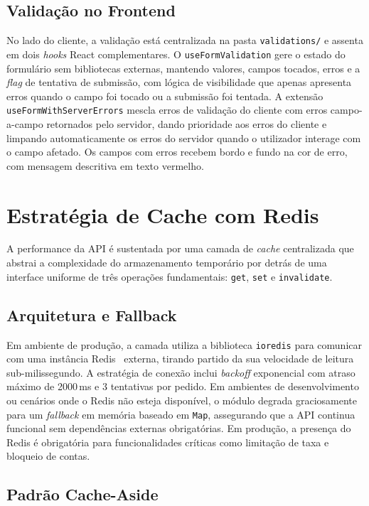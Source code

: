 \documentclass[12pt,a4paper]{report}
\begin{document}
\subsection{Validação no Frontend}

No lado do cliente, a validação está centralizada na pasta \texttt{validations/} e assenta em dois \textit{hooks} React complementares. O \texttt{useFormValidation} gere o estado do formulário sem bibliotecas externas, mantendo valores, campos tocados, erros e a \textit{flag} de tentativa de submissão, com lógica de visibilidade que apenas apresenta erros quando o campo foi tocado ou a submissão foi tentada. A extensão \texttt{useFormWithServerErrors} mescla erros de validação do cliente com erros campo-a-campo retornados pelo servidor, dando prioridade aos erros do cliente e limpando automaticamente os erros do servidor quando o utilizador interage com o campo afetado. Os campos com erros recebem bordo e fundo na cor de erro, com mensagem descritiva em texto vermelho.

\section{Estratégia de Cache com Redis}

A performance da API é sustentada por uma camada de \textit{cache} centralizada que abstrai a complexidade do armazenamento temporário por detrás de uma interface uniforme de três operações fundamentais: \texttt{get}, \texttt{set} e \texttt{invalidate}.

\subsection{Arquitetura e Fallback}

Em ambiente de produção, a camada utiliza a biblioteca \texttt{ioredis} para comunicar com uma instância Redis~\cite{redis} externa, tirando partido da sua velocidade de leitura sub-milissegundo. A estratégia de conexão inclui \textit{backoff} exponencial com atraso máximo de 2000\,ms e 3 tentativas por pedido. Em ambientes de desenvolvimento ou cenários onde o Redis não esteja disponível, o módulo degrada graciosamente para um \textit{fallback} em memória baseado em \texttt{Map}, assegurando que a API continua funcional sem dependências externas obrigatórias. Em produção, a presença do Redis é obrigatória para funcionalidades críticas como limitação de taxa e bloqueio de contas.

\subsection{Padrão Cache-Aside}
\end{document}
